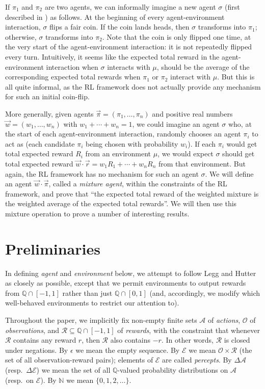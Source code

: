 \documentclass[twoside]{article}
\begin{document}
If $\pi_1$ and $\pi_2$ are two agents, we can informally imagine a new agent
$\sigma$ (first described in \cite{alexander2021reward})
as follows. At the beginning of every agent-environment interaction,
$\sigma$ flips a fair coin. If the coin lands heads, then $\sigma$ transforms into
$\pi_1$; otherwise, $\sigma$ transforms into $\pi_2$. Note that the coin is only
flipped one time, at the very start of the agent-environment interaction:
it is not repeatedly flipped every turn. Intuitively, it seems like the
expected total reward in the agent-environment interaction
when $\sigma$ interacts with $\mu$, should be the average
of the corresponding expected total rewards when $\pi_1$ or $\pi_2$ interact
with $\mu$. But this is all quite informal, as the RL
framework does not actually provide any mechanism for such an initial
coin-flip.

More generally, given agents $\vec{\pi}=(\pi_1,\ldots,\pi_n)$ and positive real
numbers
$\vec{w}=(w_1,\ldots,w_n)$ with $w_1+\cdots+w_n=1$, we could imagine an agent $\sigma$
who, at the start of each agent-environment interaction, randomly chooses
an agent $\pi_i$ to act as (each candidate $\pi_i$ being chosen with probability
$w_i$). If each $\pi_i$ would get total expected reward $R_i$ from an environment
$\mu$, we would expect $\sigma$ should get total expected reward
$\vec{w}\cdot \vec{r}=w_1R_1+\cdots+w_nR_n$ from that environment.
But again, the RL
framework has no mechanism for such an agent $\sigma$. We will define
an agent $\vec{w}\cdot\vec{\pi}$, called a \emph{mixture agent},
within the constraints
of the RL framework, and prove that ``the expected total reward of the
weighted mixture is the weighted average of the expected total rewards''.
We will then use this mixture operation to prove a number of interesting results.

\section{Preliminaries}

In defining \emph{agent} and \emph{environment} below, we attempt to follow
Legg and Hutter \cite{legg2007universal} as closely as possible,
except that we permit environments to output rewards from $\mathbb Q \cap [-1,1]$
rather than just $\mathbb Q\cap [0,1]$ (and, accordingly, we modify which well-behaved
environments to restrict our attention to).

Throughout the paper, we implicitly
fix non-empty finite sets $\mathcal A$ of \emph{actions},
$\mathcal O$ of \emph{observations},
and $\mathcal R\subseteq \mathbb Q\cap [-1,1]$ of \emph{rewards},
with the constraint that
whenever $\mathcal R$ contains any reward $r$, then $\mathcal R$
also contains $-r$. In other words, $\mathcal R$ is closed under negations.
By $\epsilon$ we mean the empty sequence.
By $\mathcal E$ we mean $\mathcal O\times\mathcal R$ (the set of all observation-reward
pairs); elements of $\mathcal E$ are called \emph{percepts}.
By $\Delta\mathcal A$ (resp.\ $\Delta\mathcal E$) we mean the set of all $\mathbb Q$-valued
probability distributions on $\mathcal A$ (resp.\ on $\mathcal E$).
By $\mathbb N$ we mean $\{0,1,2,\ldots\}$.
\end{document}
